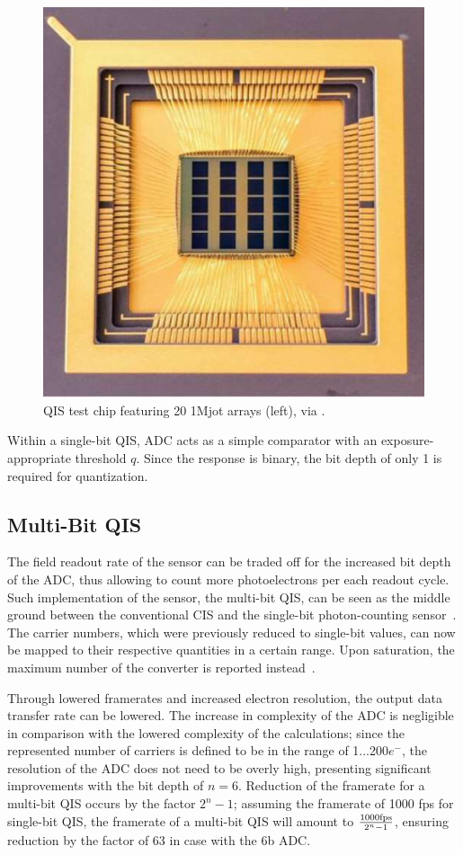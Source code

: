 \begin{figure}[h]
  \centering
  \includegraphics[width=0.5\linewidth]{imgs/qis/20Mjot.png}
  \caption{QIS test chip featuring 20 1Mjot arrays (left), via \cite{s19245459}.}
  \label{fig:20mjots}
\end{figure}

Within a single-bit QIS, ADC acts as a simple comparator with an exposure-appropriate threshold $q$. Since the response is binary, the bit depth of only 1 is required for quantization.

\subsection{Multi-Bit QIS}

The field readout rate of the sensor can be traded off for the increased bit depth of the ADC, thus allowing to count more photoelectrons per each readout cycle. Such implementation of the sensor, the multi-bit QIS, can be seen as the middle ground between the conventional CIS and the single-bit photon-counting sensor~\cite{ADCmultibit}. The carrier numbers, which were previously reduced to single-bit values, can now be mapped to their respective quantities in a certain range. Upon saturation, the maximum number of the converter is reported instead~\cite{FossumSiMulQIS}.

Through lowered framerates and increased electron resolution, the output data transfer rate can be lowered. The increase in complexity of the ADC is negligible in comparison with the lowered complexity of the calculations; since the represented number of carriers is defined to be in the range of 1...200$e^{-}$, the resolution of the ADC does not need to be overly high, presenting significant improvements with the bit depth of $n = 6$. Reduction of the framerate for a multi-bit QIS occurs by the factor $2^n -1$; assuming the framerate of 1000 fps for single-bit QIS, the framerate of a multi-bit QIS will amount to $\frac{1000 \textup{fps}}{2^{n}-1}$, ensuring reduction by the factor of 63 in case with the 6b ADC.

